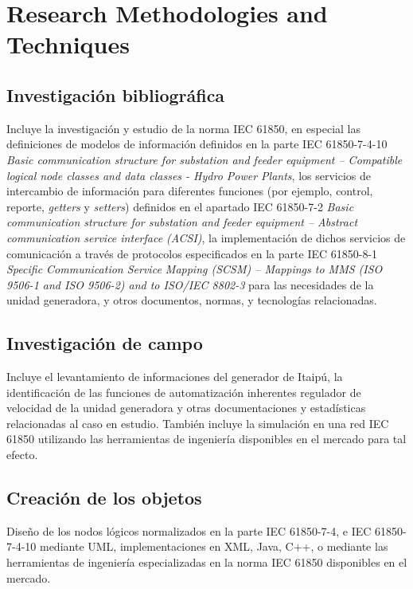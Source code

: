\section{Research Methodologies and Techniques}
	\subsection{Investigaci\'on bibliogr\'afica} 
		Incluye la investigaci\'on y estudio de la norma IEC 61850, en especial las
		definiciones de modelos de informaci\'on definidos en la parte IEC
		61850-7-4-10 \emph{Basic communication structure for substation and feeder
		equipment – Compatible logical node classes and data classes - Hydro Power
		Plants}, los servicios de intercambio de informaci\'on para diferentes
		funciones (por ejemplo, control, reporte, \emph{getters} y \emph{setters})
		definidos en el apartado IEC 61850-7-2 \emph{Basic communication structure
		for substation and feeder equipment – Abstract communication service
		interface (ACSI)}, la implementaci\'on de dichos servicios de comunicaci\'on
		a trav\'es de protocolos especificados en la parte IEC 61850-8-1
		\emph{Specific Communication Service Mapping (SCSM) – Mappings to MMS (ISO
		9506-1 and ISO 9506-2) and to ISO/IEC 8802-3} para las necesidades de la
		unidad generadora, y otros documentos, normas, y tecnolog\'ias relacionadas.
	\subsection{Investigaci\'on de campo}
		Incluye el levantamiento de informaciones del generador de Itaip\'u, la
		identificaci\'on de las funciones de automatizaci\'on inherentes regulador de
		velocidad de la unidad generadora y otras documentaciones y estad\'isticas
		relacionadas al caso en estudio. Tambi\'en incluye la simulaci\'on en una
		red IEC 61850 utilizando las herramientas de ingenier\'ia disponibles en el
		mercado para tal efecto.
	\subsection{Creaci\'on de los objetos}
		Dise\~no de los nodos l\'ogicos normalizados en la parte IEC 61850-7-4, e
		IEC 61850-7-4-10 mediante UML, implementaciones en XML, Java, C++, o
		mediante las herramientas de ingenier\'ia especializadas en la norma IEC
		61850 disponibles en el mercado.
